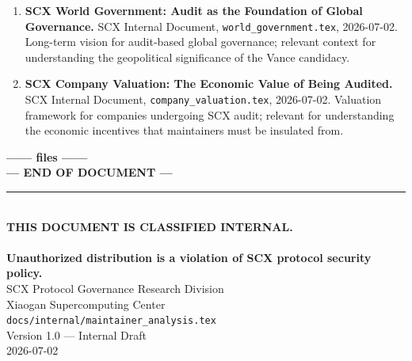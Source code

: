 \documentclass[12pt,a4paper]{article}
\theoremstyle{remark}
\begin{document}
\begin{enumerate}[leftmargin=*]
    \item \textbf{SCX World Government: Audit as the Foundation of
          Global Governance.} SCX Internal Document,
          \texttt{world\_government.tex}, 2026-07-02.
          Long-term vision for audit-based global governance; relevant
          context for understanding the geopolitical significance of
          the Vance candidacy.

    \item \textbf{SCX Company Valuation: The Economic Value of Being
          Audited.} SCX Internal Document,
          \texttt{company\_valuation.tex}, 2026-07-02.
          Valuation framework for companies undergoing SCX audit;
          relevant for understanding the economic incentives that
          maintainers must be insulated from.
\end{enumerate}

\newpage

\begin{center}
\vspace*{3cm}

{\LARGE \textcolor{scxblue}{\textbf{—— files ——}}}\\[12pt]
{\large \textcolor{scxblue}{\textbf{--- END OF DOCUMENT ---}}}\\[24pt]

\rule{0.7\textwidth}{0.5pt}\\[12pt]

{\small \textcolor{scxred}{\textbf{
THIS DOCUMENT IS CLASSIFIED INTERNAL.\\
\\
Unauthorized distribution is a violation of SCX protocol security policy.
}}}\\[12pt]

{\small \textcolor{scxgray}{
SCX Protocol Governance Research Division\\
Xiaogan Supercomputing Center\\
\texttt{docs/internal/maintainer\_analysis.tex}\\
Version 1.0 — Internal Draft\\
2026-07-02
}}

\vspace*{2cm}


\end{center}
\end{document}
